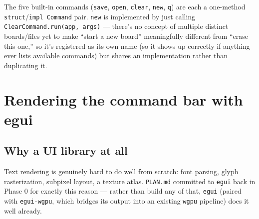 \documentclass[11pt]{article}
\begin{document}
The five built-in commands (\texttt{save}, \texttt{open}, \texttt{clear}, \texttt{new},
\texttt{q}) are each a one-method \texttt{struct}/\texttt{impl Command} pair. \texttt{new}
is implemented by just calling \texttt{ClearCommand.run(app, args)} — there's no concept of
multiple distinct boards/files yet to make ``start a new board'' meaningfully different
from ``erase this one,'' so it's registered as its own name (so it shows up correctly if
anything ever lists available commands) but shares an implementation rather than
duplicating it.

\section{Rendering the command bar with egui}
\label{sec:egui}

\subsection{Why a UI library at all}
Text rendering is genuinely hard to do well from scratch: font parsing, glyph
rasterization, subpixel layout, a texture atlas. \texttt{PLAN.md} committed to
\texttt{egui} back in Phase 0 for exactly this reason — rather than build any of that,
\texttt{egui} (paired with \texttt{egui-wgpu}, which bridges its output into an existing
\texttt{wgpu} pipeline) does it well already.
\end{document}
